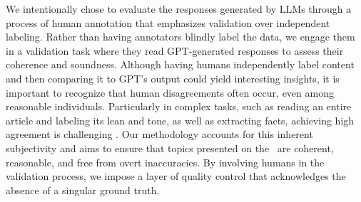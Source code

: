 We intentionally chose to evaluate the responses generated by LLMs through a process of human annotation that emphasizes validation over independent labeling. Rather than having annotators blindly label the data, we engage them in a validation task where they read GPT-generated responses to assess their coherence and soundness. Although having humans independently label content and then comparing it to GPT's output could yield interesting insights, it is important to recognize that human disagreements often occur, even among reasonable individuals. Particularly in complex tasks, such as reading an entire article and labeling its lean and tone, as well as extracting facts, achieving high agreement is challenging \cite{mitchell2018distinguishing}. Our methodology accounts for this inherent subjectivity and aims to ensure that topics presented on the \mbd\ are coherent, reasonable, and free from overt inaccuracies. By involving humans in the validation process, we impose a layer of quality control that acknowledges the absence of a singular ground truth. %